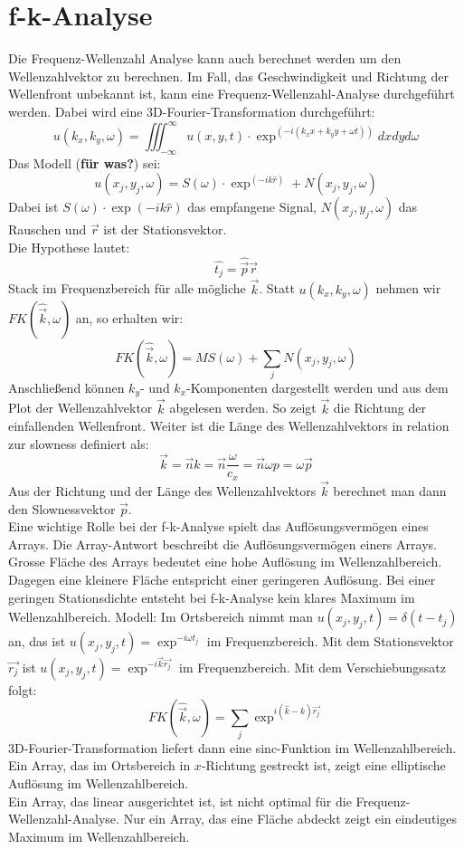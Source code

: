 \section{f-k-Analyse}
Die Frequenz-Wellenzahl Analyse kann auch berechnet werden um den Wellenzahlvektor zu berechnen.
Im Fall, das Geschwindigkeit und Richtung der Wellenfront unbekannt ist, kann eine Frequenz-Wellenzahl-Analyse durchgeführt werden. Dabei wird eine 3D-Fourier-Transformation durchgeführt:
\begin{equation}
u(k_{x},k_{y},\omega) = \iiint_{-\infty}^{\infty} u(x,y,t)\cdot\exp^{(-i(k_{x}x+k_{y}y+\omega t))} dxdyd\omega
\end{equation}
Das Modell (\textbf{für was?}) sei:
\[
u(x_{j},y_{j},\omega) = S(\omega)\cdot\exp^{(-ik\hat{r})}+N(x_{j},y_{j},\omega)
\]
{\small Dabei ist $S(\omega)\cdot\exp({-ik\hat{r}})$ das empfangene Signal, $N(x_{j},y_{j},\omega)$ das Rauschen und $\vec{r}$ ist der Stationsvektor.}\\
Die Hypothese lautet:
\[
\hat{t_{j}} = \hat{\vec{p}} \vec{r}
\]
Stack im Frequenzbereich für alle mögliche $\vec{k}$.
Statt $u(k_{x}, k_{y}, \omega)$ nehmen wir $FK(\hat{\vec{k}},\omega)$ an, so erhalten wir:
\begin{equation}
FK(\hat{\vec{k}},\omega) = M S(\omega)+\sum_{j}N(x_{j},y_{j},\omega)
\end{equation}
Anschließend können $k_{y}$- und $k_{x}$-Komponenten dargestellt werden und aus dem Plot der Wellenzahlvektor $\vec{k}$ abgelesen werden. So zeigt $\vec{k}$ die Richtung der einfallenden Wellenfront.
Weiter ist die Länge des Wellenzahlvektors in relation zur slowness definiert als:
\begin{equation}
\vec{k} = \vec{n} k = \vec{n} \dfrac{\omega}{c_x} = \vec{n} \omega p= \omega \vec{p} 
\end{equation}
Aus der Richtung und der Länge des Wellenzahlvektors $\vec{k}$ berechnet man dann den Slownessvektor $\vec{p}$.\\
Eine wichtige Rolle bei der f-k-Analyse spielt das Auflösungsvermögen eines Arrays. Die Array-Antwort beschreibt die Auflösungsvermögen einers Arrays. Grosse Fläche des Arrays bedeutet eine hohe Auflösung im Wellenzahlbereich. Dagegen eine kleinere Fläche entspricht einer geringeren Auflösung. Bei einer geringen Stationsdichte entsteht bei f-k-Analyse kein klares Maximum im Wellenzahlbereich.
Modell: Im Ortsbereich nimmt man $u(x_{j},y_{j},t) = \delta(t-t_{j})$ an, das ist $u(x_{j},y_{j},t)= \exp^{-i\omega t_{j}}$ im Frequenzbereich. Mit dem Stationsvektor $\vec{r_{j}}$ ist $u(x_{j},y_{j},t) = \exp^{-i\vec{k}\vec{r_{j}}}$  im Frequenzbereich.
Mit dem Verschiebungssatz folgt:
\begin{equation}
FK(\hat{\vec{k}},\omega) = \sum_{j}\exp^{i( \hat{k}-k)\vec{r_{j}}}
\end{equation}
3D-Fourier-Transformation liefert dann eine sinc-Funktion im Wellenzahlbereich. Ein Array, das im Ortsbereich  in $x$-Richtung gestreckt ist, zeigt eine elliptische Auflösung im Wellenzahlbereich.\\
Ein Array, das linear ausgerichtet ist, ist nicht optimal für die Frequenz-Wellenzahl-Analyse. Nur ein Array, das eine Fläche abdeckt zeigt ein eindeutiges Maximum im Wellenzahlbereich.